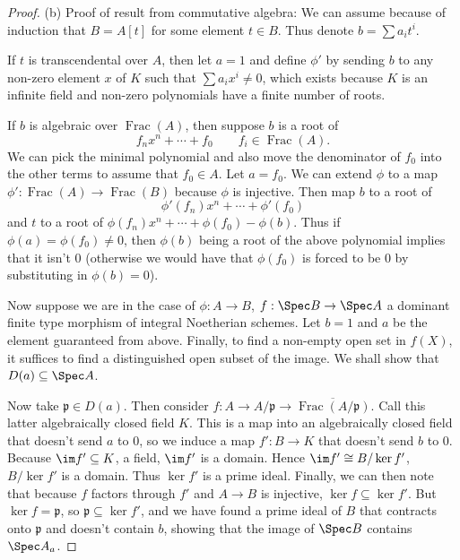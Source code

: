 \begin{proof}
	(b)
	Proof of result from commutative algebra:
	We can assume because of induction that $B = A[t]$ for some element $t\in B $.
	Thus denote $b = \sum a_it^i $.

	If $t $ is transcendental over $A $, then let $a =1$ and define $\phi ' $ by sending $b $ to any non-zero element $x $ of $K $ such that $\sum a_ix^i \ne 0 $, which exists because $K $ is an infinite field and non-zero polynomials have a finite number of roots.

	If $b $ is algebraic over $\operatorname{Frac}(A) $, then suppose $b $ is a root of
	\[
		f_nx^{n} + \cdots + f_{0} \qquad f_i \in \operatorname{Frac}(A).
	\]
	We can pick the minimal polynomial and also move the denominator of $f_0 $ into the other terms to assume that $f_0 \in A $.
	Let $a = f_0 $.
	We can extend $\phi  $ to a map $\phi ': \operatorname{Frac}(A) \to \operatorname{Frac}(B) $ because $\phi  $ is injective.
	Then map $b $ to a root of
	\[
		\phi'(f_n) x^n + \cdots + \phi'(f_{0})
	\]
	and $t $ to a root of $\phi (f_n) x^n + \cdots + \phi (f_{0}) - \phi (b)$.
	Thus if $\phi (a) = \phi (f_{0}) \ne 0 $, then $\phi (b) $ being a root of the above polynomial implies that it isn't $0 $ (otherwise we would have that $\phi (f_{0})$ is forced to be $0 $ by substituting in $\phi (b)=0 $).

	Now suppose we are in the case of $\phi : A\to B $, $f:\Spec B \to \Spec A$ a dominant finite type morphism of integral Noetherian schemes.
	Let $b =1 $ and $a$ be the element guaranteed from above.
	Finally, to find a non-empty open set in $f(X) $, it suffices to find a distinguished open subset of the image.
	We shall show that $D(a) \subseteq \Spec A $.

	Now take $\mathfrak{p} \in D(a) $.
	Then consider $f :A \to A / \mathfrak{p}\to \overline{\operatorname{Frac}(A /\mathfrak{p})}$.
	Call this latter algebraically closed field $K $.
	This is a map into an algebraically closed field that doesn't send $a $ to $0 $, so we induce a map $f': B \to K$ that doesn't send $b $ to $0 $.
	Because $\im f' \subseteq K$, a field, $\im f ' $ is a domain.
	Hence $\im f ' \cong B / \ker f ' $, $B / \ker f ' $ is a domain.
	Thus $\ker f ' $ is a prime ideal.
	Finally, we can then note that because $f$ factors through $f ' $ and $A\to B $ is injective, $\ker f \subseteq \ker f' $.
	But $\ker f = \mathfrak{p} $, so $\mathfrak{p} \subseteq \ker f' $, and we have found a prime ideal of $B $ that contracts onto $\mathfrak{p} $ and doesn't contain $b $, showing that the image of $\Spec B$ contains $\Spec A_a $.


\end{proof}
